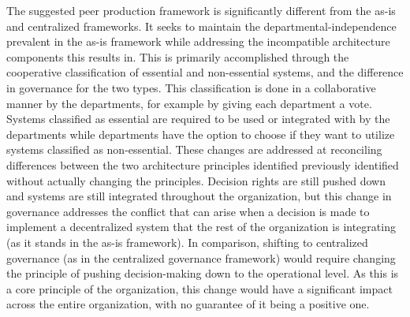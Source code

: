 



The suggested peer production framework is significantly different from the as-is and centralized frameworks. It seeks to maintain the departmental-independence prevalent in the as-is framework while addressing the incompatible architecture components this results in. This is primarily accomplished through the cooperative classification of essential and non-essential systems, and the difference in governance for the two types. This classification is done in a collaborative manner by the departments, for example by giving each department a vote. Systems classified as essential are required to be used or integrated with by the departments while departments have the option to choose if they want to utilize systems classified as non-essential. These changes are addressed at reconciling differences between the two architecture principles identified previously identified without actually changing the principles. Decision rights are still pushed down and systems are still integrated throughout the organization, but this change in governance addresses the conflict that can arise when a decision is made to implement a decentralized system that the rest of the organization is integrating (as it stands in the as-is framework). In comparison, shifting to centralized governance (as in the centralized governance framework) would require changing the principle of pushing decision-making down to the operational level. As this is a core principle of the organization, this change would have a significant impact across the entire organization, with no guarantee of it being a positive one. 

%
%
%
%
%
%

